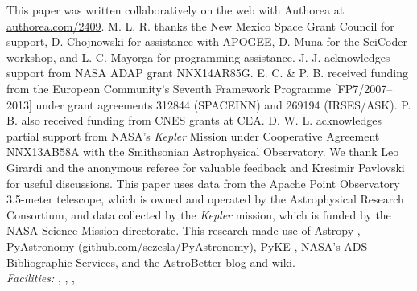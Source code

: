 \acknowledgments
This paper was written collaboratively on the web with Authorea at \url{authorea.com/2409}. M. L. R. thanks the New Mexico Space Grant Council for support, D. Chojnowski for assistance with APOGEE, D. Muna for the SciCoder workshop, and L. C. Mayorga for programming assistance. J. J. acknowledges support from NASA ADAP grant NNX14AR85G. E. C. \& P. B. received funding from the European Community's Seventh Framework Programme [FP7/2007--2013] under grant agreements 312844 (SPACEINN) and 269194 (IRSES/ASK). P. B. also received funding from CNES grants at CEA. D. W. L. acknowledges partial support from NASA's \emph{Kepler} Mission under Cooperative Agreement NNX13AB58A with the Smithsonian Astrophysical Observatory. We thank Leo Girardi and the anonymous referee for valuable feedback and Kresimir Pavlovski for useful discussions. This paper uses data from the Apache Point Observatory 3.5-meter telescope, which is owned and operated by the Astrophysical Research Consortium, and data collected by the \emph{Kepler} mission, which is funded by the NASA Science Mission directorate. This research made use of Astropy \citep{astropy}, PyAstronomy (\url{github.com/sczesla/PyAstronomy}), PyKE \citep{pyke}, NASA's ADS Bibliographic Services, and the AstroBetter blog and wiki.
\\

{\it Facilities:} , , , 

  